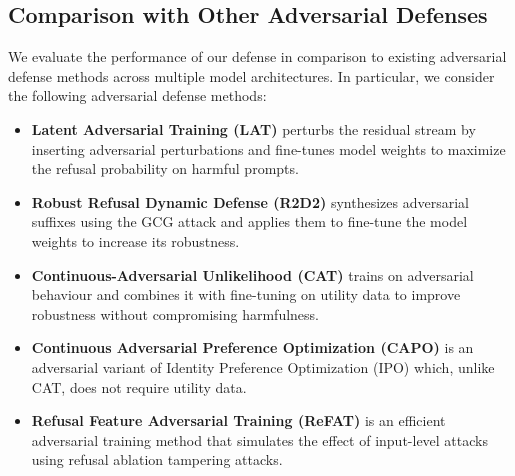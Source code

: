 \documentclass[11pt]{article}
\begin{document}
\subsection{Comparison with Other Adversarial Defenses}
\label{app:models}

We evaluate the performance of our defense in comparison to existing adversarial defense methods across multiple model architectures. In particular, we consider the following adversarial defense methods:

\begin{itemize}[noitemsep]
\item \textbf{Latent Adversarial Training (LAT)} \citep{sheshadri2024latentadversarialtrainingimproves}
perturbs the residual stream by inserting adversarial perturbations and fine-tunes model weights to maximize the refusal probability on harmful prompts.
\item \textbf{Robust Refusal Dynamic Defense (R2D2)} \citep{mazeika2024harmbenchstandardizedevaluationframework} synthesizes adversarial suffixes using the GCG attack \citep{zou2023universaltransferableadversarialattacks} and applies them to fine-tune the model weights to increase its robustness.
\item \textbf{Continuous-Adversarial Unlikelihood (CAT)} \citep{xhonneux2024efficientadversarialtrainingllms}
trains on adversarial behaviour and combines it with fine-tuning on utility data to improve robustness without compromising harmfulness.
\item \textbf{Continuous Adversarial Preference Optimization (CAPO)} \citep{xhonneux2024efficientadversarialtrainingllms} is an adversarial variant of Identity Preference Optimization (IPO) \citep{azar2023generaltheoreticalparadigmunderstand} which, unlike CAT, does not require utility data.
\item \textbf{Refusal Feature Adversarial Training (ReFAT)}\citep{yu2025robustllmsafeguardingrefusal} is an efficient adversarial training method that simulates the effect of input-level attacks using refusal ablation tampering attacks.
\end{itemize}
\end{document}
